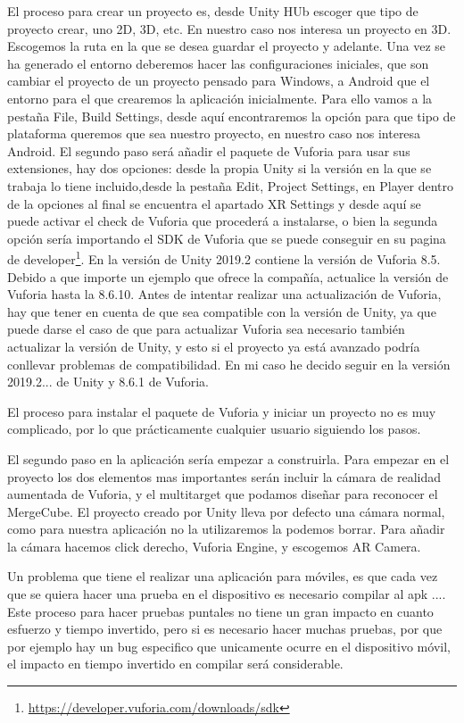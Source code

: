 El proceso para crear un proyecto es, desde Unity HUb escoger que tipo de proyecto crear, uno 2D, 3D, etc. En nuestro caso nos interesa un proyecto en 3D. Escogemos la ruta en la que se desea guardar el proyecto y adelante.
Una vez se ha generado el entorno deberemos hacer las configuraciones iniciales, que son cambiar el proyecto de un proyecto pensado para Windows, a Android que el entorno para el que crearemos la aplicación inicialmente. Para ello vamos a la pestaña File, Build Settings, desde aquí encontraremos la opción para que tipo de plataforma queremos que sea nuestro proyecto, en nuestro caso nos interesa Android.
El segundo paso será añadir el paquete de Vuforia para usar sus extensiones, hay dos opciones: desde la propia Unity si la versión en la que se trabaja lo tiene incluido,desde la pestaña Edit, Project Settings, en Player dentro de la opciones al final se encuentra el apartado XR Settings y desde aquí se puede activar el check de Vuforia que procederá a instalarse, o bien la segunda opción sería importando el SDK de Vuforia que se puede conseguir en su pagina de developer\footnote{\url{https://developer.vuforia.com/downloads/sdk}}. En la versión de Unity 2019.2 contiene la versión  de Vuforia 8.5.
Debido a que importe un ejemplo que ofrece la compañía, actualice la versión de Vuforia hasta la 8.6.10. Antes de intentar realizar una actualización de Vuforia, hay que tener en cuenta de que sea compatible con la versión de Unity, ya que puede darse el caso de que para actualizar Vuforia sea necesario también actualizar la versión de Unity, y esto si el proyecto ya está avanzado podría conllevar problemas de compatibilidad.
En mi caso he decido seguir en la versión 2019.2... de Unity y 8.6.1 de Vuforia.

El proceso para instalar el paquete de Vuforia y iniciar un proyecto no es muy complicado, por lo que prácticamente cualquier usuario siguiendo los pasos.

El segundo paso en la aplicación sería empezar a construirla. Para empezar en el proyecto los dos elementos mas importantes serán incluir la cámara de realidad aumentada de Vuforia, y el multitarget que podamos diseñar para reconocer el MergeCube. El proyecto creado por Unity lleva por defecto una cámara normal, como para nuestra aplicación no la utilizaremos la podemos borrar.
Para añadir la cámara hacemos click derecho, Vuforia Engine, y escogemos AR Camera.

Un problema que tiene el realizar una aplicación para móviles, es que cada vez que se quiera hacer una prueba en el dispositivo es necesario compilar al apk .... Este proceso para hacer pruebas puntales no tiene un gran impacto en cuanto esfuerzo y tiempo invertido, pero si es necesario hacer muchas pruebas, por que por ejemplo hay un bug especifico que unicamente ocurre en el dispositivo móvil, el impacto en tiempo invertido en compilar será considerable.


